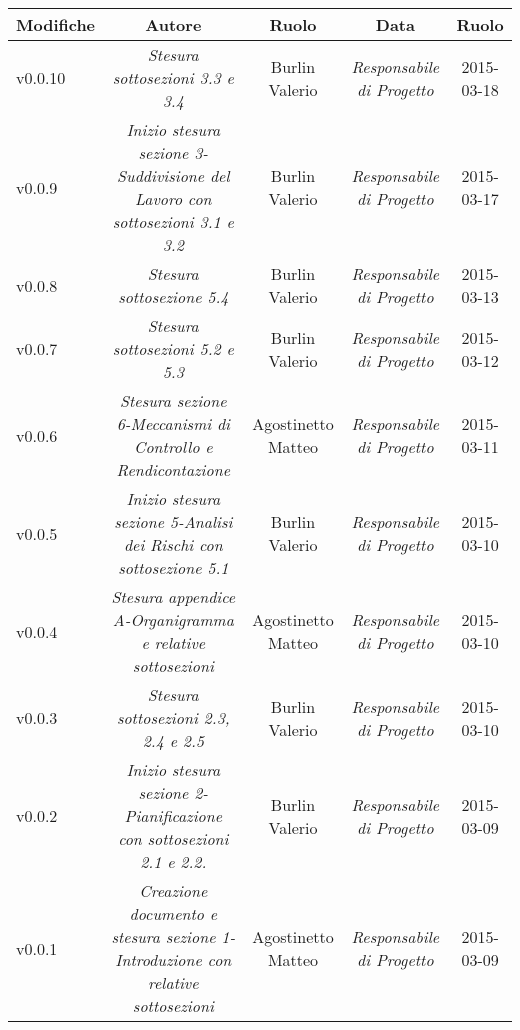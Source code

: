 \newpage

\begin{table}[h]
\centering
\begin{tabular}{|p{}|c|c|c|c|}
	\toprule
		\textbf{Modifiche} & \textbf{Autore} & \textbf{Ruolo} & \textbf{Data} & \textbf{Ruolo} \\
	\midrule
	\midrule
		v0.0.10 & \textit{Stesura sottosezioni 3.3 e 3.4} & Burlin Valerio & \textit{Responsabile di Progetto} & 2015-03-18\\
	\midrule
		v0.0.9 & \textit{Inizio stesura sezione 3-Suddivisione del Lavoro con sottosezioni 3.1 e 3.2} & Burlin Valerio & \textit{Responsabile di Progetto} & 2015-03-17\\
	\midrule
		v0.0.8 & \textit{Stesura sottosezione 5.4} & Burlin Valerio & \textit{Responsabile di Progetto} & 2015-03-13\\
	\midrule
		v0.0.7 & \textit{Stesura sottosezioni 5.2 e 5.3} & Burlin Valerio & \textit{Responsabile di Progetto} & 2015-03-12\\
	\midrule
		v0.0.6 & \textit{Stesura sezione 6-Meccanismi di Controllo e Rendicontazione} & Agostinetto Matteo & \textit{Responsabile di Progetto} & 2015-03-11\\
	\midrule
		v0.0.5 & \textit{Inizio stesura sezione 5-Analisi dei Rischi con sottosezione 5.1} & Burlin Valerio & \textit{Responsabile di Progetto} & 2015-03-10\\
	\midrule
		v0.0.4 & \textit{Stesura appendice A-Organigramma e relative sottosezioni} & Agostinetto Matteo & \textit{Responsabile di Progetto} & 2015-03-10\\
	\midrule
		v0.0.3 & \textit{Stesura sottosezioni 2.3, 2.4 e 2.5} & Burlin Valerio & \textit{Responsabile di Progetto} & 2015-03-10\\
	\midrule
		v0.0.2 & \textit{Inizio stesura sezione 2-Pianificazione con sottosezioni 2.1 e 2.2.} & Burlin Valerio & \textit{Responsabile di Progetto} & 2015-03-09\\
	\midrule
		v0.0.1 & \textit{Creazione documento e stesura sezione 1-Introduzione con relative sottosezioni} & Agostinetto Matteo & \textit{Responsabile di Progetto} & 2015-03-09\\
	\bottomrule
\end{tabular}
\end{table}

\newpage
